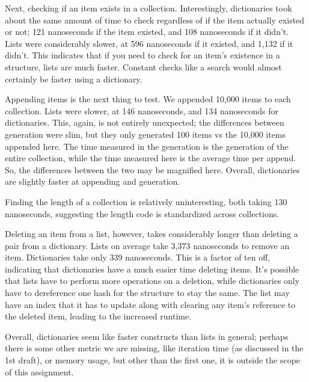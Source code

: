 \documentclass[11pt]{article}
\begin{document}
Next, checking if an item exists in a collection.
Interestingly, dictionaries took about the same amount of time to check regardless of if the item actually existed or not; 121 nanoseconds if the item existed, and 108 nanoseconds if it didn't.
Lists were considerably slower, at 596 nanoseconds if it existed, and 1,132 if it didn't.
This indicates that if you need to check for an item's existence in a structure, lists are much faster.
Constant checks like a search would almost certainly be faster using a dictionary.

Appending items is the next thing to test.
We appended 10,000 items to each collection.
Lists were slower, at 146 nanoseconds, and 134 nanoseconds for dictionaries.
This, again, is not entirely unexpected; the differences between generation were slim, but they only generated 100 items vs the 10,000 items appended here.
The time measured in the generation is the generation of the entire collection, while the time measured here is the average time per append.
So, the differences between the two may be magnified here.
Overall, dictionaries are slightly faster at appending and generation.

Finding the length of a collection is relatively uninteresting, both taking 130 nanoseconds, suggesting the length code is standardized across collections.

Deleting an item from a list, however, takes considerably longer than deleting a pair from a dictionary.
Lists on average take 3,373 nanoseconds to remove an item.
Dictionaries take only 339 nanoseconds.
This is a factor of ten off, indicating that dictionaries have a much easier time deleting items.
It's possible that lists have to perform more operations on a deletion, while dictionaries only have to dereference one hash for the structure to stay the same.
The list may have an index that it has to update along with clearing any item's reference to the deleted item, leading to the increased runtime.

Overall, dictionaries seem like faster constructs than lists in general; perhaps there is some other metric we are missing, like iteration time (as discussed in the 1st draft), or memory usage, but other than the first one, it is outside the scope of this assignment.
\end{document}
